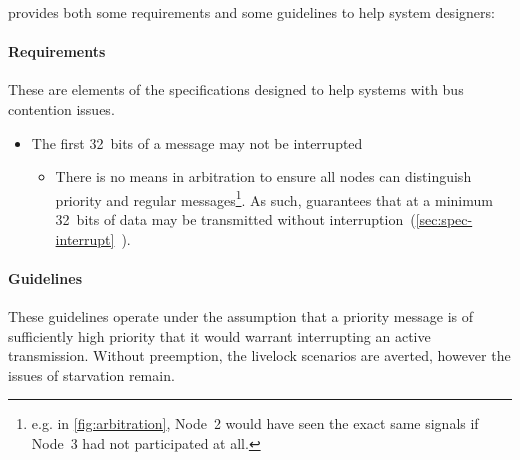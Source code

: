 \bus provides both some requirements and some guidelines to help system
designers:

\paragraph{Requirements} These are elements of the \bus specifications
designed to help systems with bus contention issues.

\begin{itemize}
  \item{The first 32~bits of a message may not be interrupted}
  \begin{itemize}
    \item There is no means in \bus arbitration to ensure all nodes can
          distinguish priority and regular messages\footnote{
            e.g. in \cref{fig:arbitration}, Node~2 would have seen the
            exact same signals if Node~3 had not participated at all.}.
          As such, \bus guarantees that at a minimum 32~bits of data may be
          transmitted without
          interruption~(\ref{sec:spec-interrupt}~).
  \end{itemize}
\end{itemize}

\paragraph{Guidelines}
These guidelines operate under the assumption that a priority message is of
sufficiently high priority that it would warrant interrupting an active
transmission. Without preemption, the livelock scenarios are averted, however
the issues of starvation remain.

